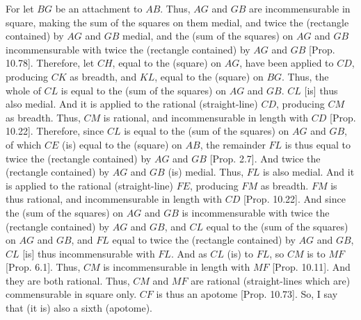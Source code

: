 \begin{Parallel}{}{}
{For let $BG$ be an attachment to $AB$. Thus, $AG$ and $GB$
are incommensurable in square, making the sum of the squares on them
medial, and twice the (rectangle contained) by $AG$ and $GB$ medial,
and the (sum of the squares) on $AG$ and $GB$ incommensurable
with twice the (rectangle contained) by $AG$ and $GB$ [Prop. 10.78]. Therefore, let $CH$, equal to
the (square) on $AG$, have been applied to $CD$, producing $CK$
as breadth, and $KL$, equal to the (square) on $BG$. Thus, the whole of
$CL$ is equal to the (sum of the squares) on $AG$ and $GB$. $CL$ [is]
thus also medial. And it is applied to the rational (straight-line) $CD$,
producing $CM$ as breadth. Thus,  $CM$ is rational, and incommensurable
in length with $CD$ [Prop. 10.22]. Therefore,
since $CL$ is equal to the (sum of the squares) on $AG$ and $GB$,
of which $CE$ (is) equal to the (square) on $AB$, the remainder $FL$
is thus equal to twice the (rectangle contained) by $AG$ and $GB$ [Prop. 2.7]. And twice the (rectangle contained)
by  $AG$ and $GB$ (is) medial. Thus, $FL$ is also medial.
And it is applied to the rational (straight-line) $FE$, producing $FM$
as breadth. $FM$ is thus rational, and incommensurable
in length with $CD$ [Prop. 10.22]. 
And since the (sum of the squares) on $AG$ and $GB$ is incommensurable
with twice the (rectangle contained) by $AG$ and $GB$, and $CL$ equal to the
(sum of the squares) on $AG$ and $GB$, and $FL$ equal to twice the
(rectangle contained) by $AG$ and $GB$, $CL$ [is] thus
incommensurable with $FL$. And as $CL$ (is) to $FL$, so $CM$ is
to $MF$ [Prop. 6.1]. Thus, $CM$ is incommensurable
in length with $MF$ [Prop. 10.11]. And they
are both rational. Thus, $CM$ and $MF$ are rational (straight-lines which are) commensurable in square only. $CF$ is thus an apotome [Prop. 10.73]. So, I say that (it is) also a
sixth (apotome).

}
\end{Parallel}
